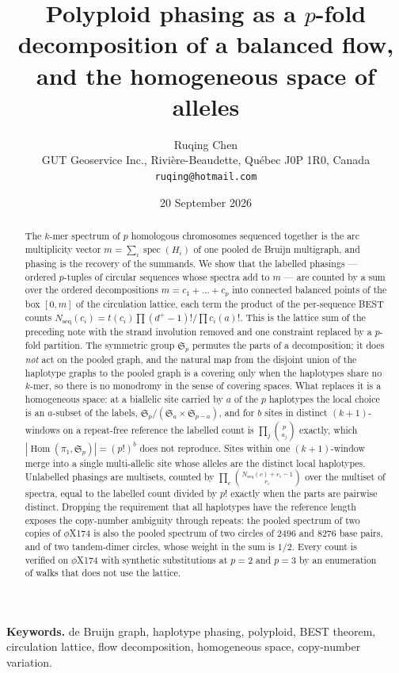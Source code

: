 \documentclass[11pt]{article}
\title{\bfseries Polyploid phasing as a $p$-fold decomposition of a balanced flow,\\
and the homogeneous space of alleles}
\author{Ruqing Chen\\[2pt]
\normalsize GUT Geoservice Inc., Rivi\`ere-Beaudette, Qu\'ebec J0P 1R0, Canada\\
\normalsize\texttt{ruqing@hotmail.com}}
\date{20 September 2026}
\theoremstyle{plain}
\theoremstyle{definition}
\theoremstyle{remark}
\newcommand{\spec}{\operatorname{spec}}
\newcommand{\Hom}{\operatorname{Hom}}
\newcommand{\Nseq}{N_{\mathrm{seq}}}
\newcommand{\Sym}{\mathfrak{S}}
\begin{document}
\maketitle

\begin{abstract}
\noindent
The $k$-mer spectrum of $p$ homologous chromosomes sequenced together is the arc
multiplicity vector $m=\sum_i\spec(H_i)$ of one pooled de Bruijn multigraph, and phasing is
the recovery of the summands. We show that the labelled phasings --- ordered $p$-tuples of
circular sequences whose spectra add to $m$ --- are counted by a sum over the ordered
decompositions $m=c_1+\dots+c_p$ into connected balanced points of the box $[0,m]$ of the
circulation lattice, each term the product of the per-sequence BEST counts
$\Nseq(c_i)=t(c_i)\prod(d^+-1)!/\prod c_i(a)!$. This is the lattice sum of the preceding
note with the strand involution removed and one constraint replaced by a $p$-fold partition.
The symmetric group $\Sym_p$ permutes the parts of a decomposition; it does \emph{not} act on
the pooled graph, and the natural map from the disjoint union of the haplotype graphs to the
pooled graph is a covering only when the haplotypes share no $k$-mer, so there is no
monodromy in the sense of covering spaces. What replaces it is a homogeneous space: at a
biallelic site carried by $a$ of the $p$ haplotypes the local choice is an $a$-subset of the
labels, $\Sym_p/(\Sym_a\times\Sym_{p-a})$, and for $b$ sites in distinct $(k{+}1)$-windows on a
repeat-free reference the labelled count is $\prod_j\binom{p}{a_j}$ exactly, which
$|\Hom(\pi_1,\Sym_p)|=(p!)^b$ does not reproduce. Sites within one $(k{+}1)$-window merge into
a single multi-allelic site whose alleles are the distinct local haplotypes. Unlabelled
phasings are multisets, counted by $\prod_c\binom{\Nseq(c)+r_c-1}{r_c}$ over the multiset of
spectra, equal to the labelled count divided by $p!$ exactly when the parts are pairwise
distinct. Dropping the requirement that all haplotypes have the reference length exposes the
copy-number ambiguity through repeats: the pooled spectrum of two copies of $\phi$X174 is also
the pooled spectrum of two circles of $2496$ and $8276$ base pairs, and of two tandem-dimer
circles, whose weight in the sum is $1/2$. Every count is verified on $\phi$X174 with synthetic
substitutions at $p=2$ and $p=3$ by an enumeration of walks that does not use the lattice.
\end{abstract}

\medskip
\noindent\textbf{Keywords.} de Bruijn graph, haplotype phasing, polyploid, BEST theorem,
circulation lattice, flow decomposition, homogeneous space, copy-number variation.
\end{document}
